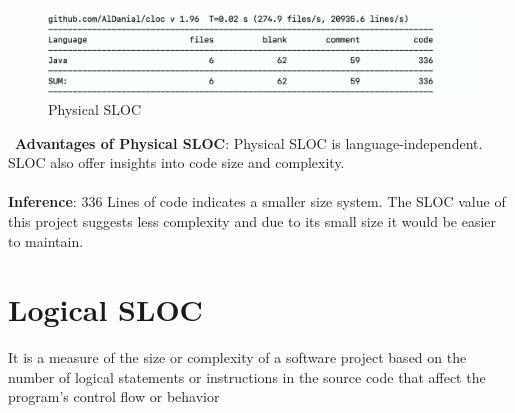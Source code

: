 \documentclass[12pt,letterpaper]{report}
\begin{document}
\begin{figure}
    \begin{center}
    \includegraphics[width=1\linewidth]{cloc.png}
    \end{center}
       \caption{Physical SLOC \label{Physical SLOC}}
\end{figure}
\
\textbf{Advantages of Physical SLOC}: Physical SLOC is language-independent. SLOC also offer insights into code size and complexity.  \\
\\
\textbf{Inference}: 336 Lines of code indicates a smaller size system. The SLOC value of this project suggests less complexity and due to its small size it would be easier to maintain.



\section{Logical SLOC}
It is a measure of the size or complexity of a software project based on the number of logical statements or instructions in the source code that affect the program's control flow or behavior
\\
\end{document}
